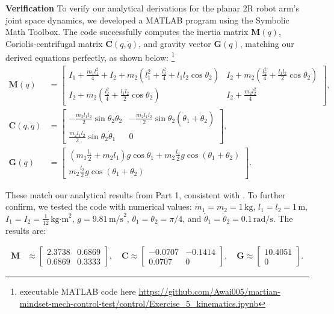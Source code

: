 \documentclass[12pt,a4paper]{article}
\begin{document}
\textbf{Verification}
To verify our analytical derivations for the planar 2R robot arm's joint space dynamics, we developed a MATLAB program using the Symbolic Math Toolbox. The code successfully computes the inertia matrix \( \bm{M}(q) \), Coriolis-centrifugal matrix \( \bm{C}(q, \dot{q}) \), and gravity vector \( \bm{G}(q) \), matching our derived equations perfectly, as shown below:
\footnote{executable MATLAB code here
\url{https://github.com/Awai005/martian-mindset-mech-control-test/control/Exercise_5_kinematics.ipynb}}
\begin{align*}
\bm{M}(q) &= \begin{bmatrix}
I_1 + \frac{m_1 l_1^2}{4} + I_2 + m_2 \left( l_1^2 + \frac{l_2^2}{4} + l_1 l_2 \cos \theta_2 \right) & I_2 + m_2 \left( \frac{l_2^2}{4} + \frac{l_1 l_2}{2} \cos \theta_2 \right) \\
I_2 + m_2 \left( \frac{l_2^2}{4} + \frac{l_1 l_2}{2} \cos \theta_2 \right) & I_2 + \frac{m_2 l_2^2}{4}
\end{bmatrix}, \\
\bm{C}(q, \dot{q}) &= \begin{bmatrix}
-\frac{m_2 l_1 l_2}{2} \sin \theta_2 \dot{\theta}_2 & -\frac{m_2 l_1 l_2}{2} \sin \theta_2 (\dot{\theta}_1 + \dot{\theta}_2) \\
\frac{m_2 l_1 l_2}{2} \sin \theta_2 \dot{\theta}_1 & 0
\end{bmatrix}, \\
\bm{G}(q) &= \begin{bmatrix}
\left( m_1 \frac{l_1}{2} + m_2 l_1 \right) g \cos \theta_1 + m_2 \frac{l_2}{2} g \cos (\theta_1 + \theta_2) \\
m_2 \frac{l_2}{2} g \cos (\theta_1 + \theta_2)
\end{bmatrix}.
\end{align*}

These match our analytical results from Part 1, consistent with \cite[Eqs.~7-44, 7-45]{Asada2022}. To further confirm, we tested the code with numerical values: \( m_1 = m_2 = 1 \, \text{kg} \), \( l_1 = l_2 = 1 \, \text{m} \), \( I_1 = I_2 = \frac{1}{12} \, \text{kg·m}^2 \), \( g = 9.81 \, \text{m/s}^2 \), \( \theta_1 = \theta_2 = \pi/4 \), and \( \dot{\theta}_1 = \dot{\theta}_2 = 0.1 \, \text{rad/s} \). The results are:

\begin{align*}
\bm{M} &\approx \begin{bmatrix} 2.3738 & 0.6869 \\ 0.6869 & 0.3333 \end{bmatrix}, \quad
\bm{C} \approx \begin{bmatrix} -0.0707 & -0.1414 \\ 0.0707 & 0 \end{bmatrix}, \quad
\bm{G} \approx \begin{bmatrix} 10.4051 \\ 0 \end{bmatrix}.
\end{align*}
\end{document}
